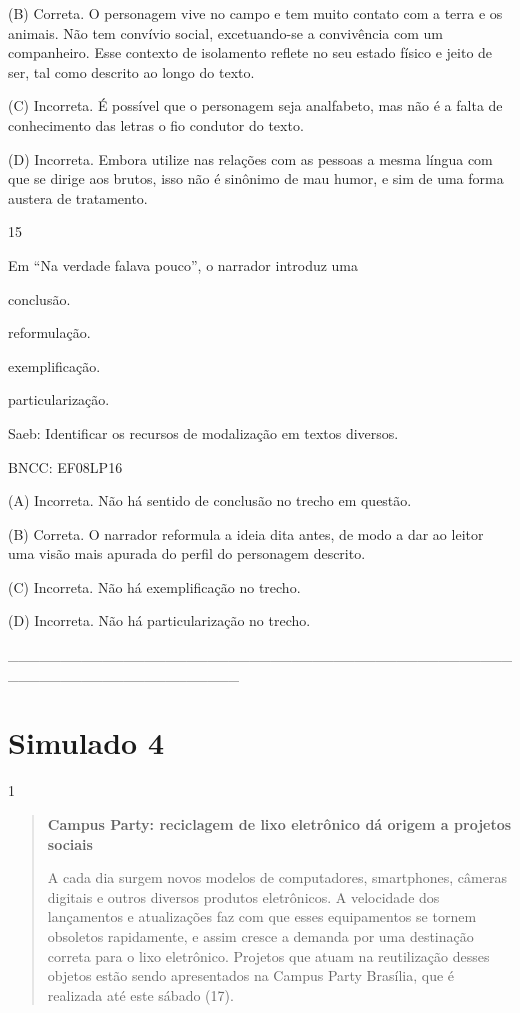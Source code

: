 (B) Correta. O personagem vive no campo e tem muito contato com a terra
e os animais. Não tem convívio social, excetuando-se a convivência com
um companheiro. Esse contexto de isolamento reflete no seu estado físico
e jeito de ser, tal como descrito ao longo do texto.

(C) Incorreta. É possível que o personagem seja analfabeto, mas não é a
falta de conhecimento das letras o fio condutor do texto.

(D) Incorreta. Embora utilize nas relações com as pessoas a mesma língua
com que se dirige aos brutos, isso não é sinônimo de mau humor, e sim de
uma forma austera de tratamento.

\num{15}

Em ``Na verdade falava pouco'', o narrador introduz uma

\begin{escolha}
\item conclusão.

\item reformulação.

\item exemplificação.

\item particularização.
\end{escolha}

Saeb: Identificar os recursos de modalização em textos diversos.

BNCC: EF08LP16

(A) Incorreta. Não há sentido de conclusão no trecho em questão.

(B) Correta. O narrador reformula a ideia dita antes, de modo a dar ao
leitor uma visão mais apurada do perfil do personagem descrito.

(C) Incorreta. Não há exemplificação no trecho.

(D) Incorreta. Não há particularização no trecho.

\_\_\_\_\_\_\_\_\_\_\_\_\_\_\_\_\_\_\_\_\_\_\_\_\_\_\_\_\_\_\_\_\_\_\_\_\_\_\_\_\_\_\_\_\_\_\_\_\_\_\_\_\_\_\_\_\_\_\_\_\_\_\_\_\_\_\_\_\_\_

\section{Simulado 4}

\num{1}

\begin{quote}
\textbf{Campus Party: reciclagem de lixo eletrônico dá origem a projetos
sociais}

A cada dia surgem novos modelos de computadores, smartphones, câmeras
digitais e outros diversos produtos eletrônicos. A velocidade dos
lançamentos e atualizações faz com que esses equipamentos se tornem
obsoletos rapidamente, e assim cresce a demanda por uma destinação
correta para o lixo eletrônico. Projetos que atuam na reutilização
desses objetos estão sendo apresentados na Campus Party Brasília, que é
realizada até este sábado (17).
\end{quote}

